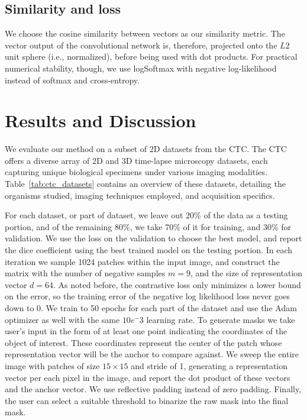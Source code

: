 \documentclass[./dissertation.tex]{subfiles}
\begin{document}
\subsection{Similarity and loss}
We choose the cosine similarity between vectors as our similarity metric. The vector output of the convolutional network is, therefore, projected onto the \(L2\) unit sphere (i.e., normalized), before being used with dot products. For practical numerical stability, though, we use logSoftmax with negative log-likelihood instead of softmax and cross-entropy.





\label{Results and Discussion}
\section{Results and Discussion}

We evaluate our method on a subset of 2D datasets from the CTC. The CTC offers a diverse array of 2D and 3D time-lapse microscopy datasets, each capturing unique biological specimens under various imaging modalities. Table~\ref{tab:ctc_datasets} contains an overview of these datasets, detailing the organisms studied, imaging techniques employed, and acquisition specifics.

For each dataset, or part of dataset, we leave out 20\% of the data as a testing portion, and of the remaining 80\%, we take 70\% of it for training, and 30\% for validation. We use the loss on the validation to choose the best model, and report the dice coefficient using the best trained model on the testing portion. In each iteration we sample 1024 patches within the input image, and construct the matrix with the number of negative samples \(m = 9\), and the size of representation vector \(d = 64\). As noted before, the contrastive loss only minimizes a lower bound on the error, so the training error of the negative log likelihood loss never goes down to \(0\). We train to 50 epochs for each part of the dataset and use the Adam optimizer as well with the same \(10e^-3\) learning rate. To generate masks we take user's input in the form of at least one point indicating the coordinates of the object of interest. These coordinates represent the center of the patch whose representation vector will be the anchor to compare against. We sweep the entire image with patches of size \({15}\times{15}\) and stride of 1, generating a representation vector per each pixel in the image, and report the dot product of these vectors and the anchor vector. We use reflective padding instead of zero padding. Finally, the user can select a suitable threshold to binarize the raw mask into the final mask.
\end{document}
